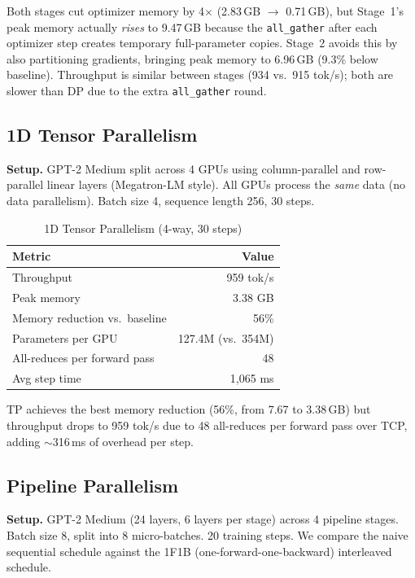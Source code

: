 \documentclass[conference]{IEEEtran}
\begin{document}
Both stages cut optimizer memory by 4$\times$ (2.83\,GB $\rightarrow$ 0.71\,GB), but Stage~1's peak memory actually \textit{rises} to 9.47\,GB because the \texttt{all_gather} after each optimizer step creates temporary full-parameter copies. Stage~2 avoids this by also partitioning gradients, bringing peak memory to 6.96\,GB (9.3\% below baseline). Throughput is similar between stages (934 vs.\ 915 tok/s); both are slower than DP due to the extra \texttt{all_gather} round.

\subsection{1D Tensor Parallelism}

\textbf{Setup.} GPT-2 Medium split across 4 GPUs using column-parallel and row-parallel linear layers (Megatron-LM style). All GPUs process the \textit{same} data (no data parallelism). Batch size 4, sequence length 256, 30 steps.

\begin{table}[h]
\centering
\caption{1D Tensor Parallelism (4-way, 30 steps)}
\label{tab:tp}
\begin{tabular}{lr}
\toprule
\textbf{Metric} & \textbf{Value} \\
\midrule
Throughput & 959 tok/s \\
Peak memory & 3.38 GB \\
Memory reduction vs.\ baseline & 56\% \\
Parameters per GPU & 127.4M (vs.\ 354M) \\
All-reduces per forward pass & 48 \\
Avg step time & 1,065 ms \\
\bottomrule
\end{tabular}
\end{table}

TP achieves the best memory reduction (56\%, from 7.67 to 3.38\,GB) but throughput drops to 959 tok/s due to 48 all-reduces per forward pass over TCP, adding $\sim$316\,ms of overhead per step.

\subsection{Pipeline Parallelism}

\textbf{Setup.} GPT-2 Medium (24 layers, 6 layers per stage) across 4 pipeline stages. Batch size 8, split into 8 micro-batches. 20 training steps. We compare the naive sequential schedule against the 1F1B (one-forward-one-backward) interleaved schedule.
\end{document}
